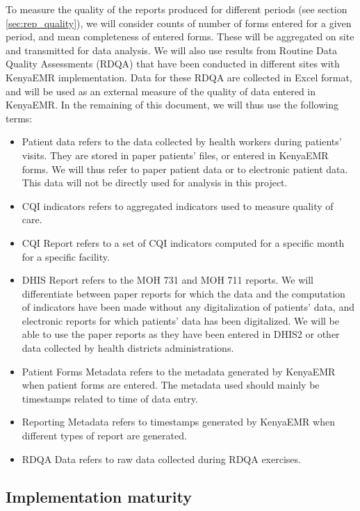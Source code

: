To measure the quality of the reports produced for different periods (see section \ref{sec:rep_quality}), we will consider counts of number of forms entered for a given period, and mean completeness of entered forms. These will be aggregated on site and transmitted for data analysis. We will also use results from Routine Data Quality Assessments (RDQA) that have been conducted in different sites with KenyaEMR implementation. Data for these RDQA are collected in Excel format, and will be used as an external measure of the quality of data entered in KenyaEMR.
In the remaining of this document, we will thus use the following terms:
\begin{itemize}
	\item Patient data refers to the data collected by health workers during patients’ visits. They are stored in paper patients’ files, or entered in KenyaEMR forms. We will thus refer to paper patient data or to electronic patient data. This data will not be directly used for analysis in this project.
	\item CQI indicators refers to aggregated indicators used to measure quality of care.
	\item CQI Report refers to a set of CQI indicators computed for a specific month for a specific facility.
	\item DHIS Report refers to the MOH 731 and MOH 711 reports. We will differentiate between paper reports for which the data and the computation of indicators have been made without any digitalization of patients’ data, and electronic reports for which patients’ data has been digitalized. We will be able to use the paper reports as they have been entered in DHIS2 or other data collected by health districts administrations.
	\item Patient Forms Metadata refers to the metadata generated by KenyaEMR when patient forms are entered. The metadata used should mainly be timestamps related to time of data entry.
	\item Reporting Metadata refers to timestamps generated by KenyaEMR when different types of report are generated.
	\item RDQA Data refers to raw data collected during RDQA exercises.
\end{itemize}

\subsection{Implementation maturity}
\label{sec:maturity}

